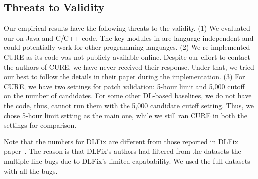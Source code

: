 \subsection{Threats to Validity}



Our empirical results have the following threats to the validity. (1)
We evaluated our {\tool} on Java and C/C++ code.  The key modules in
{\tool} are language-independent and could potentially work for other programming
languages. (2) We re-implemented CURE as its code was not publicly
available online. Despite our effort to contact the authors of CURE,
we have never received their response. Under that, we tried our best
to follow the details in their paper during the implementation.
(3) For CURE, we have two settings for patch validation: 5-hour limit
and 5,000 cutoff on the number of candidates. For some other DL-based
baselines, we do not have the code, thus, cannot run them with the
5,000 candidate cutoff setting. Thus, we chose 5-hour limit setting as
the main one, while we still ran CURE in both the settings for
comparison.

Note that the numbers for DLFix are different from those reported in
DLFix paper~\cite{icse20}. The reason is that DLFix's authors had
filtered from the datasets the multiple-line bugs due to DLFix's
limited capabability. We used the full datasets with all the bugs.



